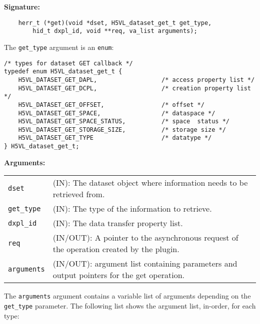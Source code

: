 \textbf{Signature:}
\begin{lstlisting}
    herr_t (*get)(void *dset, H5VL_dataset_get_t get_type, 
        hid_t dxpl_id, void **req, va_list arguments);
\end{lstlisting}

The {\tt get\_type} argument is an {\tt enum}:
\begin{lstlisting}
/* types for dataset GET callback */
typedef enum H5VL_dataset_get_t {
    H5VL_DATASET_GET_DAPL,                  /* access property list */
    H5VL_DATASET_GET_DCPL,                  /* creation property list */
    H5VL_DATASET_GET_OFFSET,                /* offset */
    H5VL_DATASET_GET_SPACE,                 /* dataspace */
    H5VL_DATASET_GET_SPACE_STATUS,          /* space  status */
    H5VL_DATASET_GET_STORAGE_SIZE,          /* storage size */
    H5VL_DATASET_GET_TYPE                   /* datatype */
} H5VL_dataset_get_t;
\end{lstlisting}

\textbf{Arguments:}\\
\begin{tabular}{l p{10cm}}
  {\tt dset} & (IN): The dataset object where information needs to be
  retrieved from.\\
  {\tt get\_type} & (IN): The type of the information to retrieve.\\
  {\tt dxpl\_id} & (IN): The data transfer property list.\\
  {\tt req} & (IN/OUT): A pointer to the asynchronous request of the
  operation created by the plugin.\\
  {\tt arguments} & (IN/OUT): argument list containing parameters and
  output pointers for the get operation. \\
\end{tabular}

The {\tt arguments} argument contains a variable list of arguments
depending on the {\tt get\_type} parameter. The following list shows
the argument list, in-order, for each type:

